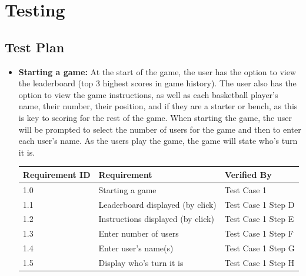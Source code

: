 \documentclass[]{report}   %
\begin{document}
\chapter{Testing}           %
\section{Test Plan}     %

\begin{itemize}

\item \textbf{Starting a game:} At the start of the game, the user has the option to view the leaderboard (top 3 highest scores in game history). The user also has the option to view the game instructions, as well as each basketball player's name, their number, their position, and if they are a starter or bench, as this is key to scoring for the rest of the game. When starting the game, the user will be prompted to select the number of users for the game and then to enter each user's name. As the users play the game, the game will state who's turn it is.
    \begin{center}
    \begin{tabular}{ | l | p{3.5in}  | l | }
    \hline
    \textbf{Requirement ID} & \textbf{Requirement} & \textbf{Verified By} \\ \hline
    1.0 & Starting a game & Test Case 1\\ \hline
    1.1 & Leaderboard displayed (by click) & Test Case 1 Step D\\ \hline
    1.2 & Instructions displayed (by click) & Test Case 1 Step E\\ \hline
    1.3 & Enter number of users & Test Case 1 Step F\\ \hline
    1.4 & Enter user's name(s) & Test Case 1 Step G\\ \hline
    1.5 & Display who's turn it is & Test Case 1 Step H\\ \hline
    \end{tabular}
    \end{center}



\end{itemize}
\end{document}
